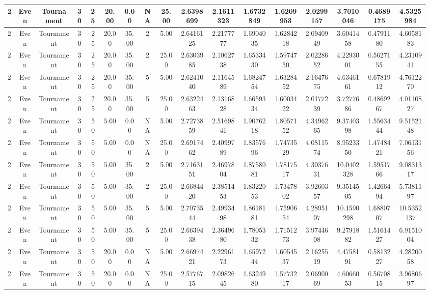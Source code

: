 \documentclass[a4paper]{article}
\begin{document}
\begin{center}
\begin{tabular}{ | c | c | c | c | c | c | c | c | c | c | c | c | c | c | c | c | c | }
		\hline
		2	&	Even	&	Tournament	&	30	&	25	&	20.00	&	0.00	&	NA	&	25.00	&	2.6398699	&	2.1611323	&	1.6732849	&	1.6209953	&	2.0299157	&	3.7010046	&	0.4689175	&	4.5325984 \\
		\hline
		2	&	Even	&	Tournament	&	30	&	25	&	20.00	&	35.00	&	2	&	5.00	&	2.6416125	&	2.2177777	&	1.6904035	&	1.6284218	&	2.0940949	&	3.6041458	&	0.4791180	&	4.6058183 \\
		\hline
		2	&	Even	&	Tournament	&	30	&	25	&	20.00	&	35.00	&	2	&	25.00	&	2.6303985	&	2.1062738	&	1.6533430	&	1.5974750	&	2.0228652	&	4.2293001	&	0.5627155	&	4.2310941 \\
		\hline
		2	&	Even	&	Tournament	&	30	&	25	&	20.00	&	35.00	&	5	&	5.00	&	2.6241040	&	2.1164589	&	1.6824754	&	1.6328452	&	2.1647675	&	4.6346161	&	0.6781912	&	4.7612270 \\
		\hline
		2	&	Even	&	Tournament	&	30	&	25	&	20.00	&	35.00	&	5	&	25.00	&	2.6322463	&	2.1316828	&	1.6659334	&	1.6003422	&	2.0177239	&	3.7277686	&	0.4869267	&	4.0110827 \\
		\hline
		2	&	Even	&	Tournament	&	30	&	50	&	5.00	&	0.00	&	NA	&	5.00	&	2.7273859	&	2.5169841	&	1.9076218	&	1.8057152	&	4.3496265	&	9.3740398	&	1.5563444	&	9.5152148 \\
		\hline
		2	&	Even	&	Tournament	&	30	&	50	&	5.00	&	0.00	&	NA	&	25.00	&	2.6917462	&	2.4099789	&	1.8357696	&	1.7473529	&	4.0811574	&	8.9523350	&	1.4748421	&	7.0613156 \\
		\hline
		2	&	Even	&	Tournament	&	30	&	50	&	5.00	&	35.00	&	2	&	5.00	&	2.7163151	&	2.4697804	&	1.8758081	&	1.7817517	&	4.3037631	&	10.0402328	&	1.5951766	&	9.0831317 \\
		\hline
		2	&	Even	&	Tournament	&	30	&	50	&	5.00	&	35.00	&	2	&	25.00	&	2.6684420	&	2.3851453	&	1.8322053	&	1.7347802	&	3.9260357	&	9.3514505	&	1.4266494	&	5.7381197 \\
		\hline
		2	&	Even	&	Tournament	&	30	&	50	&	5.00	&	35.00	&	5	&	5.00	&	2.7073544	&	2.4993498	&	1.8618181	&	1.7590654	&	4.2895107	&	10.1590298	&	1.6880707	&	10.5352137 \\
		\hline
		2	&	Even	&	Tournament	&	30	&	50	&	5.00	&	35.00	&	5	&	25.00	&	2.6639438	&	2.3649680	&	1.7805332	&	1.7151273	&	3.9744608	&	9.2791882	&	1.5161427	&	6.9151004 \\
		\hline
		2	&	Even	&	Tournament	&	30	&	50	&	20.00	&	0.00	&	NA	&	5.00	&	2.6697421	&	2.2296173	&	1.6597244	&	1.6054537	&	2.1625519	&	4.4758191	&	0.5813227	&	4.2820058 \\
		\hline
		2	&	Even	&	Tournament	&	30	&	50	&	20.00	&	0.00	&	NA	&	25.00	&	2.5776715	&	2.0982645	&	1.6324980	&	1.5773217	&	2.0690069	&	4.6066053	&	0.5670815	&	3.9680697 \\

\end{tabular}
\end{center}
\end{document}

